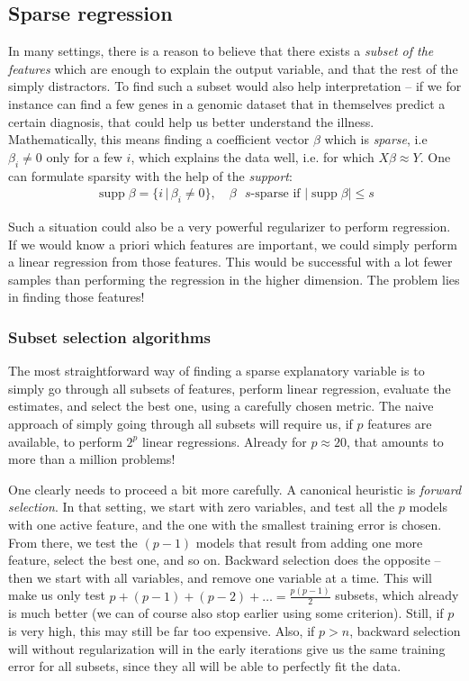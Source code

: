 \documentclass{article}
\DeclareMathOperator{\supp}{\mathrm{supp}}
\newcommand{\abs}[1]{\vert #1 \vert}
\begin{document}
\subsection{Sparse regression}
In many settings, there is a reason to believe that there exists a \emph{subset of the features} which are enough to explain the output variable, and that the rest of the simply distractors. To find such a subset would also help interpretation -- if we for instance can find a few genes in a genomic dataset that in themselves predict a certain diagnosis, that could help us better understand the illness. Mathematically, this means finding a coefficient vector $\beta$ which is \emph{sparse}, i.e $\beta_i \neq 0$ only for a few $i$, which explains the data well, i.e. for which $X\beta \approx Y$. One can formulate sparsity with the help of the \emph{support}:
\begin{align*}
    \supp \beta  = \{ i \, \vert \, \beta_i \neq 0\}, \quad \beta \text{ $s$-sparse  if } \abs{\supp \beta} \leq s
\end{align*}

Such a situation could also be a very powerful regularizer to perform regression. If we would know a priori which features are important, we could simply perform a linear regression from those features. This would be successful with a lot fewer samples than performing the regression in the higher dimension. The problem lies in finding those features!


\subsubsection{Subset selection algorithms}
The most straightforward way of finding a sparse explanatory variable is to simply go through all subsets of features, perform linear regression, evaluate the estimates, and select the best one, using a carefully chosen metric. The naive approach of simply going through all subsets will require us, if $p$ features are available, to perform $2^p$ linear regressions. Already for $p\approx 20$, that amounts to more than a million problems! 

One clearly needs to proceed a bit more carefully. A canonical heuristic is \emph{forward selection}. In that setting, we start with zero variables, and test all the $p$ models with one active feature, and the one with the smallest training error is chosen. From there, we test the $(p-1)$ models that result from adding one more feature, select the best one, and so on. Backward selection does the opposite -- then we start with all variables, and remove one variable at a time. This will make us only test $p + (p-1)+(p-2) + \dots = \frac{p(p-1)}{2}$ subsets, which already is much better (we can of course also stop earlier using some criterion). Still, if $p$ is very high, this may still be far too expensive. Also, if $p>n$, backward selection will without regularization will in the early iterations give us the same training error for all subsets, since they all will be able to perfectly fit the data.
\end{document}

